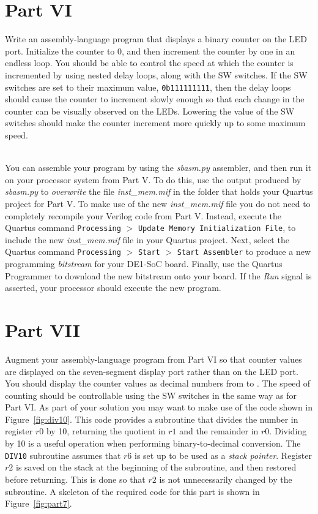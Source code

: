 \documentclass[epsfig,10pt,fullpage]{article}
\begin{document}
\section*{Part VI}
Write an assembly-language program that displays a binary counter on the LED port. Initialize 
the counter to 0, and then increment the counter by one in an endless loop. You should be
able to control the speed at which the counter is incremented by using nested delay loops, 
along with the SW switches. If the SW switches are set to their maximum value, 
\texttt{0b111111111}, then the delay loops should cause the counter to increment slowly enough 
so that each change in the counter can be visually observed on the LEDs. Lowering the value 
of the SW switches should make the counter increment more quickly up to some maximum speed. 

~\\
\noindent
You can assemble your program by using the {\it sbasm.py} assembler, and then run it on
your processor system from Part V. To do this, use the output produced by {\it sbasm.py} to 
{\it overwrite} the file {\it inst\_mem.mif} in the folder that holds your Quartus project for
Part V. To make use of the new {\it inst\_mem.mif} file you do not need to completely 
recompile your Verilog code from Part V. Instead, execute the Quartus command 
\texttt{Processing} $>$ \texttt{Update Memory Initialization File}, to include the 
new {\it inst\_mem.mif} file in your Quartus project. Next, select the Quartus 
command \texttt{Processing} $>$ \texttt{Start} $>$ \texttt{Start Assembler} to produce a new 
programming {\it bitstream} for your DE1-SoC board. Finally, use the Quartus Programmer to 
download the new bitstream onto your board. If the {\it Run} signal is asserted, your
processor should execute the new program.

\section*{Part VII}
Augment your assembly-language program from Part VI so that counter values are displayed
on the seven-segment display port rather than on the LED port. You should display the
counter values as decimal numbers from \texttt{} to \texttt{}.
The speed of counting should be controllable using the SW switches in the same way as for
Part VI. As part of your solution you may want to make use of the code shown in 
Figure~\ref{fig:div10}. This code provides a subroutine that divides the number in
register $r0$ by 10, returning the quotient in $r1$ and the remainder in $r0$. Dividing by 10 is a 
useful operation when performing binary-to-decimal conversion. The \texttt{DIV10} subroutine
assumes that $r6$ is set up to be used as a {\it stack pointer}. Register $r2$ is saved on the
stack at the beginning of the subroutine, and then restored before returning. This is done so
that $r2$ is not unnecessarily changed by the subroutine. A skeleton of the required code
for this part is shown in Figure~\ref{fig:part7}.
\end{document}
